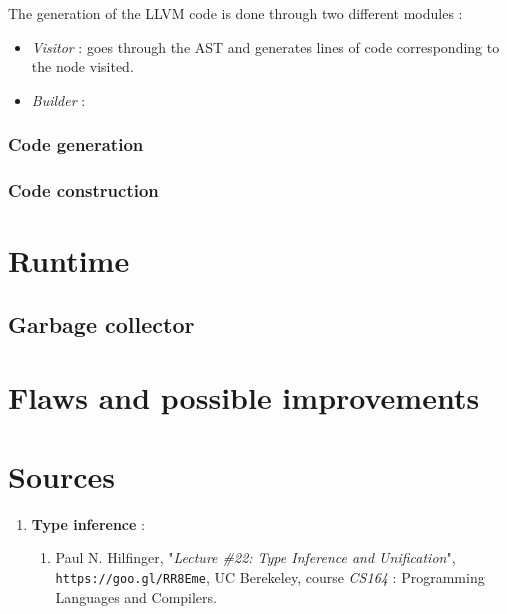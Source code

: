 \documentclass[a4paper,11pt]{article}
\begin{document}
The generation of the LLVM code is done through two different modules :
\begin{itemize}
	\item \textit{Visitor} : goes through the AST and generates lines of code corresponding to the node visited.
	\item \textit{Builder} :
\end{itemize}

	\subsubsection{Code generation}


	\subsubsection{Code construction}


\section{Runtime}
\subsection{Garbage collector}
\label{ssec:garabage_collector}
\section{Flaws and possible improvements}
\appendix
\section{Sources}
\begin{enumerate}
	\item \textbf{Type inference} :
	\begin{enumerate}
		\item\label{enum:inference_unification} Paul N. Hilfinger, "\textit{Lecture \#22: Type Inference and Unification}", \texttt{https://goo.gl/RR8Eme}, UC Berekeley, course \textit{CS164} : Programming Languages and Compilers.
	\end{enumerate}
\end{enumerate}
\end{document}
